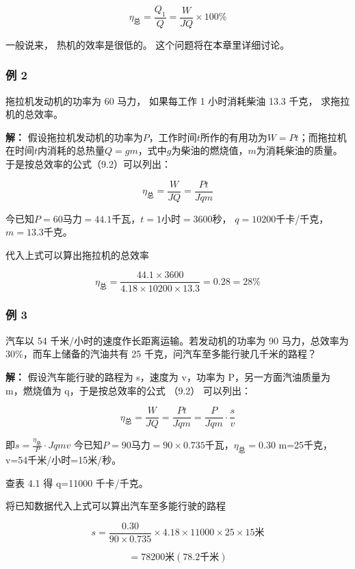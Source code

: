 \[
\eta_ {\text{总}} = \frac {Q _ {1}}{Q} = \frac {W}{J Q} \times 100 \% \tag{9.2}
\]

一般说来， 热机的效率是很低的。 这个问题将在本章里详细讨论。

\subsubsection{例 2}\label{ux4f8b-2-9}

拖拉机发动机的功率为 60 马力， 如果每工作 1 小时消耗柴油 13.3 千克，
求拖拉机的总效率。

\textbf{解：}
假设拖拉机发动机的功率为\(P\)，工作时间\(t\)所作的有用功为\(W = Pt\)；而拖拉机在时间\(t\)内消耗的总热量\(Q = gm\)，式中\(g\)为柴油的燃烧值，\(m\)为消耗柴油的质量。于是按总效率的公式（9.2）可以列出：

\[
\eta_ {\text{总}} = \frac {W}{J Q} = \frac {P t}{J q m}
\]

今已知\(P = 60\)马力\(= 44.1\)千瓦，\(t = 1\)小时\(= 3600\)秒，
\(q = 10200\)千卡/千克，\(m = 13.3\)千克。

代入上式可以算出拖拉机的总效率

\[
\eta_ {\text{总}} = \frac {44.1 \times 3600}{4.18 \times 10200 \times 13.3} = 0.28 = 28 \%
\]

\subsubsection{例 3}\label{ux4f8b-3-7}

汽车以 54 千米/小时的速度作长距离运输。若发动机的功率为 90
马力，总效率为 30\%，而车上储备的汽油共有 25
千克，问汽车至多能行驶几千米的路程？

\textbf{解：} 假设汽车能行驶的路程为 s，速度为 v，功率为
P，另一方面汽油质量为 m，燃烧值为 q，于是按总效率的公式 （9.2）
可以列出：

\[
\eta_ {\text{总}} = \frac {W}{J Q} = \frac {P t}{J q m} = \frac {P}{J q m} \cdot \frac {s}{v}
\]

即\(s = \frac{\eta_{\text{总}}}{P} \cdot J q m v\)
今已知\(P = 90\)马力\(= 90 \times 0.735\)千瓦，\(\eta_{\text{总}} = 0.30\)
m=25千克，v=54千米/小时=15米/秒。

查表 4.1 得 q=11000 千卡/千克。

将已知数据代入上式可以算出汽车至多能行驶的路程

\[
s = \frac {0.30}{90 \times 0.735} \times 4.18 \times 11000 \times 25 \times 15 \text{米}
\]

\[
= 78200 \text{米} (78.2 \text{千米})
\]

